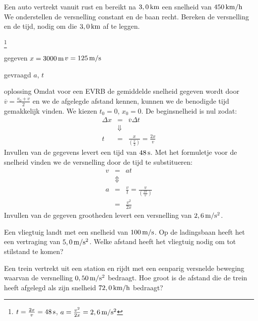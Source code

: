 \begin{exercise} Een auto vertrekt vanuit rust en bereikt na $3,0\rm\,km$ een snelheid van $450\rm\,km/h$ We onderstellen de versnelling constant en de baan recht. Bereken de versnelling en de tijd, nodig om die $3,0\rm\,km$ af te leggen.
\begin{oplossing}
\footnote{$t=\frac{2x}{v}=48\rm\,s$, $a=\frac{v^2}{2x}=2,6\rm\,m/s^2$}
\item[gegeven]$x=3000\rm\,m$\newline $v=125\rm\,m/s$
\item[gevraagd]$a$, $t$
\item[oplossing]Omdat voor een EVRB de gemiddelde snelheid gegeven wordt door $\overline{v}=\frac{v_0+v}{2}$ en we de afgelegde afstand kennen, kunnen we de benodigde tijd gemakkelijk vinden. We kiezen $t_0=0$, $x_0=0$. De beginsnelheid is nul zodat:
\begin{eqnarray*}
\Delta x &=& \overline{v}\Delta t \\
&\Downarrow & \\
t &=& \frac{x}{\left(\frac{v}{2}\right)} = \frac{2x}{v}
\end{eqnarray*}
Invullen van de gegevens levert een tijd van $48\rm\,s$. Met het formuletje voor de snelheid vinden we de versnelling door de tijd te substitueren:
\begin{eqnarray*}
v &=& at \\
&\Updownarrow&\\
a &=& \frac{v}{t}=\frac{v}{\left(\frac{2x}{v}\right)}\\
&=& \frac{v^2}{2x}
\end{eqnarray*}
Invullen van de gegeven grootheden levert een versnelling van $2,6\rm\,m/s^2$.
\end{oplossing}

\end{exercise}

\begin{exercise} Een vliegtuig landt met een snelheid van $100\rm\,m/s$. Op de ladingsbaan heeft het een vertraging van $5,0\rm\,m/s^2$. Welke afstand heeft het vliegtuig nodig om tot stilstand te komen?

\end{exercise}

\begin{exercise} Een trein vertrekt uit een station en rijdt met een eenparig
versnelde beweging waarvan de versnelling $0,50\rm\,m/s^2$ bedraagt.
Hoe groot is de afstand die de trein heeft afgelegd als zijn
snelheid $72,0\rm\,km/h$ bedraagt?



\end{exercise}

